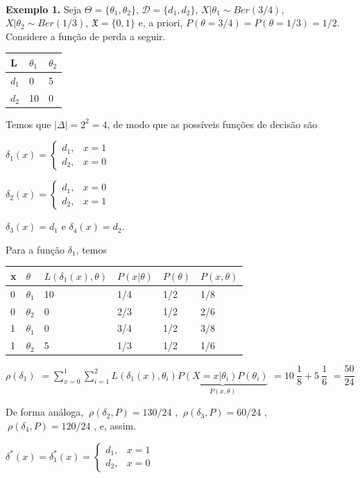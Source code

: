 \documentclass[
]{book}
\begin{document}
\(~\)

\textbf{Exemplo 1.} Seja \(\Theta=\{\theta_1,\theta_2\}\), \(\mathcal{D}=\{d_1,d_2\}\), \(X|\theta_1\sim Ber(3/4)\), \(X|\theta_2 \sim Ber(1/3)\), \(\mathfrak{X}=\{0,1\}\) e, a priori, \(P(\theta=3/4)=P(\theta=1/3)=1/2\). Considere a função de perda a seguir.

\begin{longtable}[]{@{}lll@{}}
\toprule
L & \(\theta_1\) & \(\theta_2\)\tabularnewline
\midrule
\endhead
\(d_1\) & 0 & 5\tabularnewline
\(d_2\) & 10 & 0\tabularnewline
\bottomrule
\end{longtable}

Temos que \(|\Delta| = 2^2=4\), de modo que as possíveis funções de decisão são

\(\delta_1(x)=\left\{\begin{array}{lr} d_1, & x=1\\ d_2, &x=0\end{array}\right.\)

\(\delta_2(x)=\left\{\begin{array}{lr} d_1, & x=0\\ d_2, &x=1\end{array}\right.\)

\(\delta_3(x)=d_1\) e \(\delta_4(x)=d_2\).

Para a função \(\delta_1\), temos

\begin{longtable}[]{@{}llllll@{}}
\toprule
x & \(\theta\) & \(L(\delta_1(x),\theta)\) & \(P(x|\theta)\) & \(P(\theta)\) & \(P(x,\theta)\)\tabularnewline
\midrule
\endhead
0 & \(\theta_1\) & 10 & 1/4 & 1/2 & 1/8\tabularnewline
0 & \(\theta_2\) & 0 & 2/3 & 1/2 & 2/6\tabularnewline
1 & \(\theta_1\) & 0 & 3/4 & 1/2 & 3/8\tabularnewline
1 & \(\theta_2\) & 5 & 1/3 & 1/2 & 1/6\tabularnewline
\bottomrule
\end{longtable}

\(\rho(\delta_1)\) \(=\displaystyle \sum_{x=0}^1\sum_{i=1}^2L(\delta_1(x),\theta_i)\underbrace{P(X=x|\theta_i)P(\theta_i)}_{P(x,\theta)}\) \(=10~\dfrac{1}{8}+5~\dfrac{1}{6}\) \(=\dfrac{50}{24}\)

De forma análoga, \(~\rho(\delta_2,P)=130/24\) , \(~\rho(\delta_3,P)=60/24\) , \(~\rho(\delta_4,P)=120/24\) , e, assim.

\({\delta}^*(x)={\delta}^*_1(x)=\left\{\begin{array}{rl} d_1, & x=1\\ d_2, & x=0\end{array}\right.\)
\end{document}
